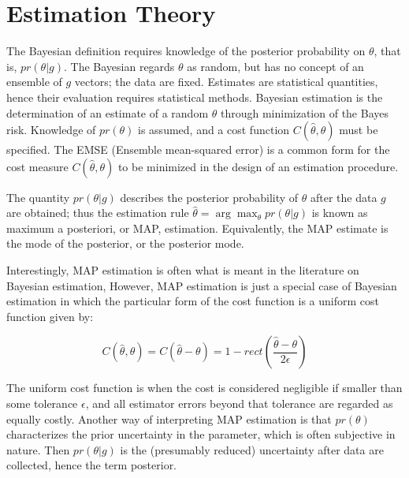 \chapter{Estimation Theory}\label{App:estimation}
The Bayesian definition requires knowledge of the posterior probability on $\theta$, that is, $pr(\theta|g)$.  The Bayesian regards $\theta$ as random, but has no concept of an ensemble of $g$ vectors; the data are fixed.  
Estimates are statistical quantities, hence their evaluation requires statistical methods.
Bayesian estimation is the determination of an estimate of a random $\theta$ through minimization of the Bayes risk.  Knowledge of $pr(\theta)$ is assumed, and a cost function $C(\hat{\theta}, \theta)$ must be specified.   The EMSE (Ensemble mean-squared error) is a common form for the cost measure $C(\hat{\theta}, \theta)$ to be minimized in the design of an estimation procedure.

The quantity $pr(\theta|g)$ describes the posterior probability of $\theta$ after the data $g$ are obtained; thus the estimation rule $\hat{\theta} = \arg\max_{\theta} pr(\theta|g)$ is known as maximum a posteriori, or MAP, estimation.  Equivalently, the MAP estimate is the mode of the posterior, or the posterior mode.

Interestingly, MAP estimation is often what is meant in the literature on Bayesian estimation, However, MAP estimation is just a special case of Bayesian estimation in which the particular form of the cost function is a uniform cost function given by:

\begin{equation}
C(\hat{\theta}, \theta) = C(\hat{\theta}-\theta) = 1 - rect \left( \frac{\hat{\theta}- \theta}{2\epsilon}   \right)
\end{equation}

The uniform cost function is when the cost is considered negligible if smaller than some tolerance $\epsilon$, and all estimator errors beyond that tolerance are regarded as equally costly.
Another way of interpreting MAP estimation is that $pr(\theta)$ characterizes the prior uncertainty in the parameter, which is often subjective in nature.  Then $pr(\theta|g)$ is the (presumably reduced) uncertainty after data are collected, hence the term posterior.


